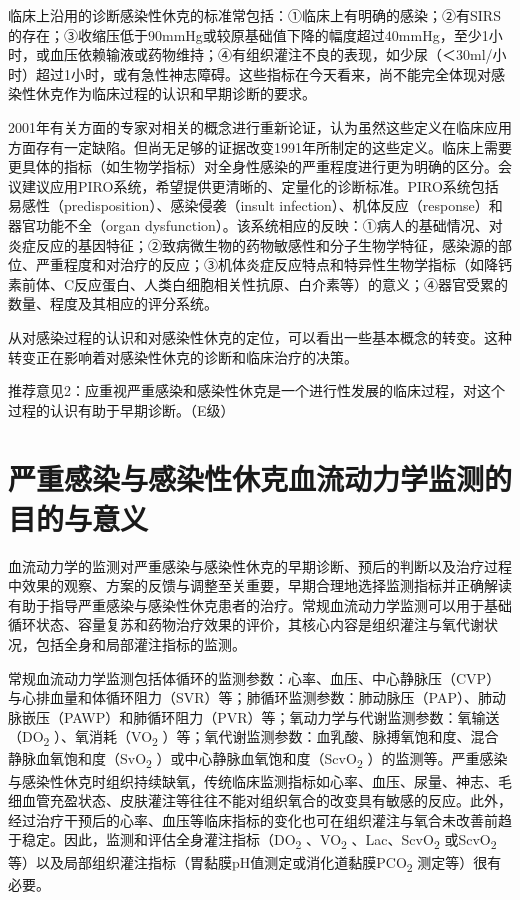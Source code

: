 临床上沿用的诊断感染性休克的标准常包括：①临床上有明确的感染；②有SIRS的存在；③收缩压低于90mmHg或较原基础值下降的幅度超过40mmHg，至少1小时，或血压依赖输液或药物维持；④有组织灌注不良的表现，如少尿（＜30ml/小时）超过1小时，或有急性神志障碍。这些指标在今天看来，尚不能完全体现对感染性休克作为临床过程的认识和早期诊断的要求。

2001年有关方面的专家对相关的概念进行重新论证，认为虽然这些定义在临床应用方面存有一定缺陷。但尚无足够的证据改变1991年所制定的这些定义。临床上需要更具体的指标（如生物学指标）对全身性感染的严重程度进行更为明确的区分。会议建议应用PIRO系统，希望提供更清晰的、定量化的诊断标准。PIRO系统包括易感性（predisposition）、感染侵袭（insult
infection）、机体反应（response）和器官功能不全（organ
dysfunction）。该系统相应的反映：①病人的基础情况、对炎症反应的基因特征；②致病微生物的药物敏感性和分子生物学特征，感染源的部位、严重程度和对治疗的反应；③机体炎症反应特点和特异性生物学指标（如降钙素前体、C反应蛋白、人类白细胞相关性抗原、白介素等）的意义；④器官受累的数量、程度及其相应的评分系统。

从对感染过程的认识和对感染性休克的定位，可以看出一些基本概念的转变。这种转变正在影响着对感染性休克的诊断和临床治疗的决策。

推荐意见2：应重视严重感染和感染性休克是一个进行性发展的临床过程，对这个过程的认识有助于早期诊断。（E级）

\section{严重感染与感染性休克血流动力学监测的目的与意义}

血流动力学的监测对严重感染与感染性休克的早期诊断、预后的判断以及治疗过程中效果的观察、方案的反馈与调整至关重要，早期合理地选择监测指标并正确解读有助于指导严重感染与感染性休克患者的治疗。常规血流动力学监测可以用于基础循环状态、容量复苏和药物治疗效果的评价，其核心内容是组织灌注与氧代谢状况，包括全身和局部灌注指标的监测。

常规血流动力学监测包括体循环的监测参数：心率、血压、中心静脉压（CVP）与心排血量和体循环阻力（SVR）等；肺循环监测参数：肺动脉压（PAP）、肺动脉嵌压（PAWP）和肺循环阻力（PVR）等；氧动力学与代谢监测参数：氧输送（DO\textsubscript{2}
）、氧消耗（VO\textsubscript{2}
）等；氧代谢监测参数：血乳酸、脉搏氧饱和度、混合静脉血氧饱和度（SvO\textsubscript{2}
）或中心静脉血氧饱和度（ScvO\textsubscript{2}
）的监测等。严重感染与感染性休克时组织持续缺氧，传统临床监测指标如心率、血压、尿量、神志、毛细血管充盈状态、皮肤灌注等往往不能对组织氧合的改变具有敏感的反应。此外，经过治疗干预后的心率、血压等临床指标的变化也可在组织灌注与氧合未改善前趋于稳定。因此，监测和评估全身灌注指标（DO\textsubscript{2}
、VO\textsubscript{2} 、Lac、ScvO\textsubscript{2}
或ScvO\textsubscript{2}
等）以及局部组织灌注指标（胃黏膜pH值测定或消化道黏膜PCO\textsubscript{2}
测定等）很有必要。

